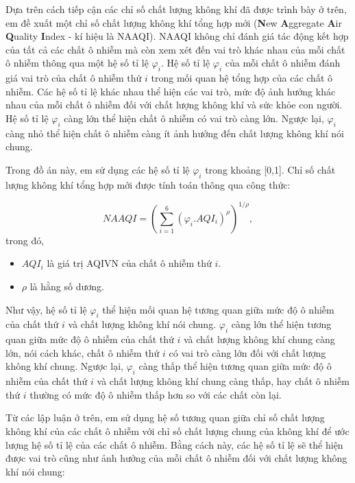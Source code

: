 \documentclass[14pt]{extreport}
\theoremstyle{definition}
\theoremstyle{plain}
\theoremstyle{remark}
\begin{document}
Dựa trên cách tiếp cận các chỉ số chất lượng không khí đã được trình bày ở trên, em đề xuất một chỉ số chất lượng không khí tổng hợp mới (\textbf{N}ew \textbf{A}ggregate  \textbf{A}ir \textbf{Q}uality \textbf{I}ndex - kí hiệu là NAAQI). NAAQI không chỉ đánh giá tác động kết hợp của tất cả các chất ô nhiễm mà còn xem xét đến vai trò khác nhau của mỗi chất ô nhiễm thông qua một hệ số tỉ lệ $\varphi_i$. Hệ số tỉ lệ $\varphi_i$ của mỗi chất ô nhiễm đánh giá vai trò của chất ô nhiễm thứ $i$ trong mối quan hệ tổng hợp của các chất ô nhiễm. Các hệ số tỉ lệ khác nhau thể hiện các vai trò, mức độ ảnh hưởng khác nhau của mỗi chất ô nhiễm đối với chất lượng không khí và sức khỏe con người. Hệ số tỉ lệ $\varphi_i$ càng lớn thể hiện chất ô nhiễm có vai trò càng lớn. Ngược lại, $\varphi_i$ càng nhỏ thể hiện chất ô nhiễm càng ít ảnh hưởng đến chất lượng không khí nói chung.

Trong đồ án này, em sử dụng các hệ số tỉ lệ $\varphi_i$ trong khoảng [0,1]. Chỉ số chất lượng không khí tổng hợp mới được tính toán thông qua công thức:

\begin{equation}
NAAQI = {\left( \sum_{i = 1}^6 \left(\varphi_i. AQI_i\right)^{\rho} \right)}^{1/\rho},
\end{equation}
trong đó,  
\begin{itemize}
\item $AQI_i$ là giá trị AQIVN của chất ô nhiễm thứ $i$.
\item $\rho$ là hằng số dương.
\end{itemize}

Như vậy, hệ số tỉ lệ $\varphi_i$ thể hiện mối quan hệ tương quan giữa mức độ ô nhiễm của chất thứ $i$ và chất lượng không khí nói chung. $\varphi_i$ càng lớn thể hiện tương quan giữa mức độ ô nhiễm của chất thứ $i$ và chất lượng không khí chung càng lớn, nói cách khác, chất ô nhiễm thứ $i$ có vai trò càng lớn đối với chất lượng không khí chung. Ngược lại, $\varphi_i$ càng thấp thể hiện tương quan giữa mức độ ô nhiễm của chất thứ $i$ và chất lượng không khí chung càng thấp, hay chất ô nhiễm thứ $i$ thường có mức độ ô nhiễm thấp hơn so với các chất còn lại.

Từ các lập luận ở trên, em sử dụng hệ số tương quan giữa chỉ số chất lượng không khí của các chất ô nhiễm với chỉ số chất lượng chung của không khí để ước lượng hệ số tỉ lệ của các chất ô nhiễm. Bằng cách này, các hệ số tỉ lệ sẽ thể hiện được vai trò cũng như ảnh hưởng của mỗi chất ô nhiễm đối với chất lượng không khí nói chung:
\end{document}
